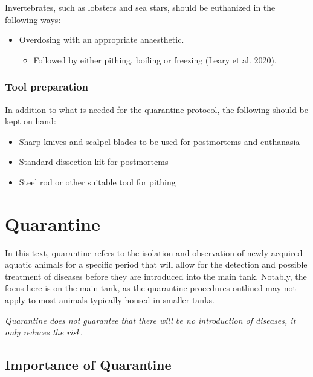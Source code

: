 \documentclass[
  letterpaper,
  DIV=11,
  numbers=noendperiod]{scrreprt}
\providecommand{\tightlist}{%
  \setlength{\itemsep}{0pt}\setlength{\parskip}{0pt}}\usepackage{longtable,booktabs,array}
\begin{document}
Invertebrates, such as lobsters and sea stars, should be euthanized in
the following ways:

\begin{itemize}
\tightlist
\item
  Overdosing with an appropriate anaesthetic.

  \begin{itemize}
  \tightlist
  \item
    Followed by either pithing, boiling or freezing (Leary et al. 2020).
  \end{itemize}
\end{itemize}

\hypertarget{sec-health-tool}{%
\subsection{Tool preparation}\label{sec-health-tool}}

In addition to what is needed for the quarantine protocol, the following
should be kept on hand:

\begin{itemize}
\tightlist
\item
  Sharp knives and scalpel blades to be used for postmortems and
  euthanasia
\item
  Standard dissection kit for postmortems
\item
  Steel rod or other suitable tool for pithing
\end{itemize}

\hypertarget{sec-quarantine}{%
\chapter{Quarantine}\label{sec-quarantine}}

In this text, quarantine refers to the isolation and observation of
newly acquired aquatic animals for a specific period that will allow for
the detection and possible treatment of diseases before they are
introduced into the main tank. Notably, the focus here is on the main
tank, as the quarantine procedures outlined may not apply to most
animals typically housed in smaller tanks.

\emph{Quarantine does not guarantee that there will be no introduction
of diseases, it only reduces the risk.}

\hypertarget{importance-of-quarantine}{%
\section{Importance of Quarantine}\label{importance-of-quarantine}}
\end{document}
